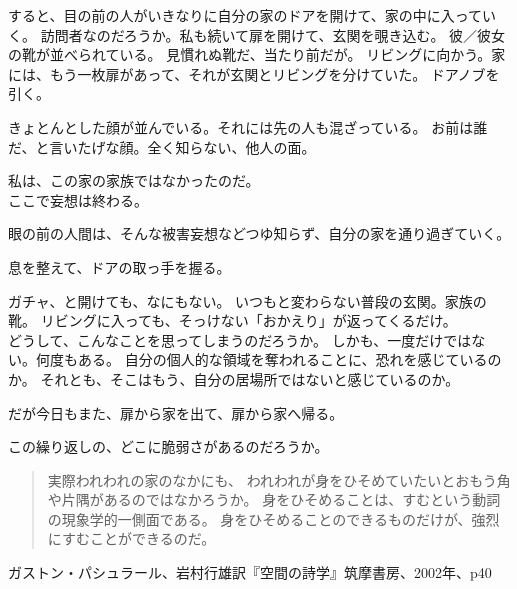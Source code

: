 \documentclass[../IHMain]{subfiles}
\begin{document}
すると、目の前の人がいきなりに自分の家のドアを開けて、家の中に入っていく。
訪問者なのだろうか。私も続いて扉を開けて、玄関を覗き込む。
彼／彼女の靴が並べられている。
見慣れぬ靴だ、当たり前だが。
リビングに向かう。家には、もう一枚扉があって、それが玄関とリビングを分けていた。
ドアノブを引く。

きょとんとした顔が並んでいる。それには先の人も混ざっている。
お前は誰だ、と言いたげな顔。全く知らない、他人の面。

私は、この家の家族ではなかったのだ。\\

ここで妄想は終わる。

眼の前の人間は、そんな被害妄想などつゆ知らず、自分の家を通り過ぎていく。

息を整えて、ドアの取っ手を握る。

ガチャ、と開けても、なにもない。
いつもと変わらない普段の玄関。家族の靴。
リビングに入っても、そっけない「おかえり」が返ってくるだけ。\\

どうして、こんなことを思ってしまうのだろうか。
しかも、一度だけではない。何度もある。
自分の個人的な領域を奪われることに、恐れを感じているのか。
それとも、そこはもう、自分の居場所ではないと感じているのか。

だが今日もまた、扉から家を出て、扉から家へ帰る。

この繰り返しの、どこに脆弱さがあるのだろうか。

\begin{quotation}
\noindent
実際われわれの家のなかにも、
われわれが身をひそめていたいとおもう角や片隅があるのではなかろうか。
身をひそめることは、すむという動詞の現象学的一側面である。
身をひそめることのできるものだけが、強烈にすむことができるのだ。
\end{quotation}
ガストン・パシュラール、岩村行雄訳『空間の詩学』筑摩書房、2002年、p40
\twocolumn
\end{document}
